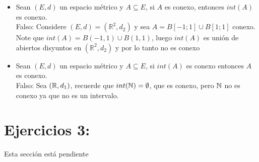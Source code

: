 \begin{itemize}[label={✎},leftmargin=*]
\item Sean $(E,d)$ un espacio métrico y $A\subseteq E$, si $A$ es conexo, entonces $int(A)$ es conexo.\\

Falso: Considere $(E,d)=(\mathbb{R}^2,d_2)$ y sea $A=B[-1;1]\cup B[1;1]$ conexo. Note que $int(A)=B(-1,1)\cup B(1,1)$, luego $int(A)$ es unión de abiertos disyuntos en $(\mathbb{R}^2,d_2)$ y por lo tanto no es conexo

\item Sean $(E,d)$ un espacio métrico y $A\subseteq E$, si $int(A)$ es conexo entonces $A$ es conexo.\\

Falso: Sea $(\mathbb{R},d_1)$, recuerde que $int(\mathbb{N})=\emptyset$, que es conexo, pero $\mathbb{N}$ no es conexo ya que no es un intervalo.
\end{itemize}


\section{Ejercicios 3:}

\begin{note}
Esta sección está pendiente
\end{note}



